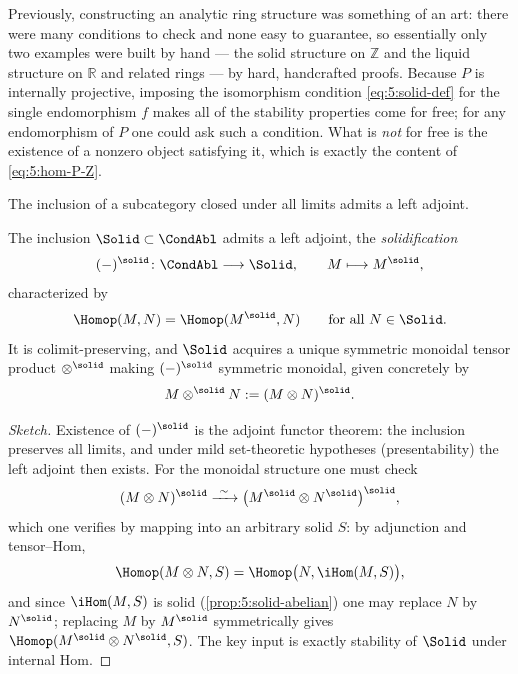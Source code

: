 \begin{remark}
\label{rmk:5:for-free}
Previously, constructing an analytic ring structure was something of an art:
there were many conditions to check and none easy to guarantee, so essentially
only two examples were built by hand --- the solid structure on $\mathbb{Z}$ and
the liquid structure on $\mathbb{R}$ and related rings --- by hard, handcrafted
proofs. Because $P$ is internally projective, imposing the isomorphism condition
\eqref{eq:5:solid-def} for the single endomorphism $f$ makes all of the stability
properties come for free; for any endomorphism of $P$ one could ask such a
condition. What is \emph{not} for free is the existence of a nonzero object
satisfying it, which is exactly the content of \eqref{eq:5:hom-P-Z}.
\end{remark}

The inclusion of a subcategory closed under all limits admits a left adjoint.

\begin{corollary}[Solidification]
\label{cor:5:solidification}
The inclusion $\Solid\subset\CondAbl$ admits a left adjoint, the
\emph{solidification}
\begin{equation*}
(-)^{\solid}\colon\CondAbl\longrightarrow\Solid,\qquad M\longmapsto M^{\solid},
\end{equation*}
characterized by
\begin{equation*}
\Homop(M,N)=\Homop(M^{\solid},N)\qquad\text{for all }N\in\Solid.
\end{equation*}
It is colimit-preserving, and $\Solid$ acquires a unique symmetric monoidal tensor
product $\otimes^{\solid}$ making $(-)^{\solid}$ symmetric monoidal, given
concretely by
\begin{equation*}
M\otimes^{\solid}N:=(M\otimes N)^{\solid}.
\end{equation*}
\end{corollary}

\begin{proof}[Sketch]
Existence of $(-)^{\solid}$ is the adjoint functor theorem: the inclusion
preserves all limits, and under mild set-theoretic hypotheses (presentability)
the left adjoint then exists. For the monoidal structure one must check
\begin{equation*}
(M\otimes N)^{\solid}\xrightarrow{\ \sim\ }\bigl(M^{\solid}\otimes N^{\solid}\bigr)^{\solid},
\end{equation*}
which one verifies by mapping into an arbitrary solid $S$: by adjunction and
tensor--Hom,
\[
\Homop(M\otimes N,S)=\Homop\bigl(N,\iHom(M,S)\bigr),
\]
and since $\iHom(M,S)$ is solid (\cref{prop:5:solid-abelian}) one may replace $N$
by $N^{\solid}$; replacing $M$ by $M^{\solid}$ symmetrically gives
$\Homop(M^{\solid}\otimes N^{\solid},S)$. The key input is exactly stability of
$\Solid$ under internal Hom.
\end{proof}

